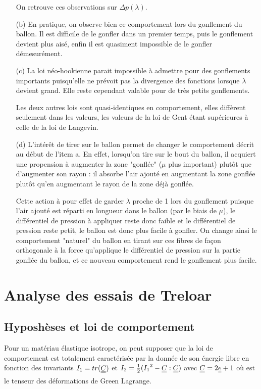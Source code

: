 \documentclass[a4paper,11pt]{article}
\begin{document}
\begin{enumerate}
On retrouve ces observations sur $\Delta p (\lambda)$.

\item[(b)]
En pratique, on observe bien ce comportement lors du gonflement du ballon. Il est difficile de le gonfler dans un premier temps, puis le gonflement devient plus aisé, enfin il est quasiment impossible de le gonfler démesurément.

\item[(c)]
La loi néo-hookienne parait impossible à admettre pour des gonflements importants puisqu'elle ne prévoit pas la divergence des fonctions lorsque $\lambda$ devient grand. Elle reste cependant valable pour de très petits gonflements.

\hspace{0.8cm}Les deux autres lois sont quasi-identiques en comportement, elles diffèrent seulement dans les valeurs, les valeurs de la loi de Gent étant supérieures à celle de la loi de Langevin.

\item[(d)]
L'intérêt de tirer sur le ballon permet de changer le comportement décrit au début de l'item a. En effet, lorsqu'on tire sur le bout du ballon, il acquiert une propension à augmenter la zone "gonflée" ($\mu$ plus important) plutôt que d'augmenter son rayon : il absorbe l'air ajouté en augmentant la zone gonflée plutôt qu'en augmentant le rayon de la zone déjà gonflée.

\hspace{0.8cm}Cette action à pour effet de garder $\lambda$ proche de 1 lors du gonflement puisque l'air ajouté est réparti en longueur dans le ballon (par le biais de $\mu$), le différentiel de pression à appliquer reste donc faible et le différentiel de pression reste petit, le ballon est donc plus facile à gonfler. On change ainsi le comportement "naturel" du ballon en tirant sur ces fibres de façon orthogonale à la force qu'applique le différentiel de pression sur la partie gonflée du ballon, et ce nouveau comportement rend le gonflement plus facile.
\end{enumerate}


\section{Analyse des essais de Treloar}
\subsection{Hyposhèses et loi de comportement}
Pour un matériau élastique isotrope, on peut supposer que la loi de comportement est totalement caractérisée par la donnée de son énergie libre en fonction des invariants $I_1= tr(\uuline{C})$ et $I_2=\frac{1}{2}({I_1}^2-\uuline{C}:\uuline{C})$ avec $\uuline{C} = 2\uuline{e}+1$ où  est le tenseur des déformations de Green Lagrange.
\end{document}
